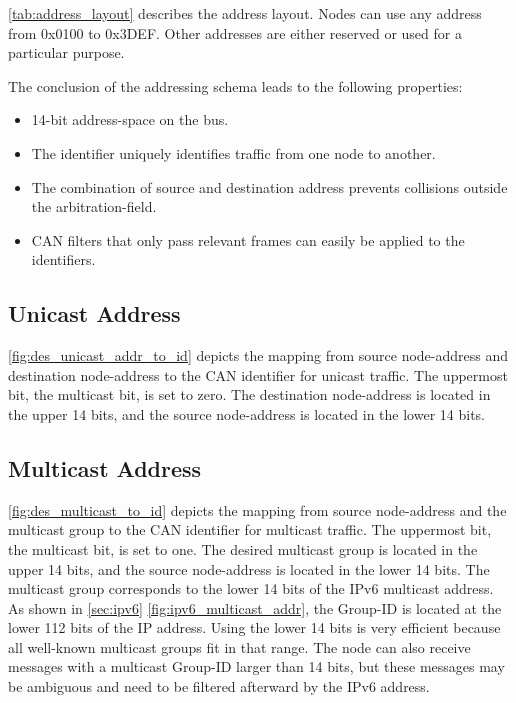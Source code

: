 \autoref{tab:address_layout} describes the address layout.
Nodes can use any address from 0x0100 to 0x3DEF.
Other addresses are either reserved or used for a particular purpose.

The conclusion of the addressing schema leads to the following properties:
\begin{itemize}
        \item 14-bit address-space on the bus.
        \item The identifier uniquely identifies traffic from one node to another.
        \item The combination of source and destination address prevents collisions outside the arbitration-field.
        \item CAN filters that only pass relevant frames can easily be applied to the identifiers.
\end{itemize}

\newpage

\subsection{Unicast Address}
\label{sec:unicast_addr}



\autoref{fig:des_unicast_addr_to_id} depicts the mapping from source node-address and destination node-address to the CAN identifier for unicast traffic.
The uppermost bit, the multicast bit, is set to zero.
The destination node-address is located in the upper 14 bits, and the source node-address is located in the lower 14 bits.


\subsection{Multicast Address}
\label{sec:multicast_addr}



\autoref{fig:des_multicast_to_id} depicts the mapping from source node-address and the multicast group to the CAN identifier for multicast traffic.
The uppermost bit, the multicast bit, is set to one.
The desired multicast group is located in the upper 14 bits, and the source node-address is located in the lower 14 bits.
The multicast group corresponds to the lower 14 bits of the IPv6 multicast address.
As shown in \autoref{sec:ipv6} \autoref{fig:ipv6_multicast_addr}, the Group-ID is located at the lower 112 bits of the IP address.
Using the lower 14 bits is very efficient because all well-known multicast groups fit in that range.
The node can also receive messages with a multicast Group-ID larger than 14 bits,
but these messages may be ambiguous and need to be filtered afterward by the IPv6 address.

